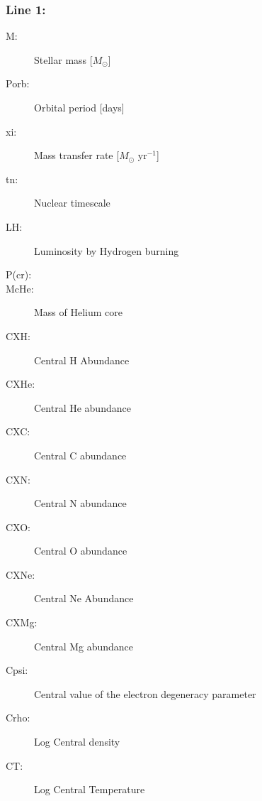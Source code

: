 \subsubsection*{Line 1:}
\begin{description}
\item[M:] Stellar mass [$M_\odot$]
\item[Porb:] Orbital period [days]
\item[xi:] Mass transfer rate [$M_\odot$ yr$^{-1}$]
\item[tn:] Nuclear timescale
\item[LH:] Luminosity by Hydrogen burning
\item[P(cr):]
\item[McHe:] Mass of Helium core
\item[CXH:] Central H Abundance
\item[CXHe:] Central He abundance
\item[CXC:] Central C abundance
\item[CXN:] Central N abundance
\item[CXO:] Central O abundance
\item[CXNe:] Central Ne Abundance
\item[CXMg:] Central Mg abundance
\item[Cpsi:] Central value of the electron degeneracy parameter
\item[Crho:] Log Central density
\item[CT:] Log Central Temperature
\end{description}



